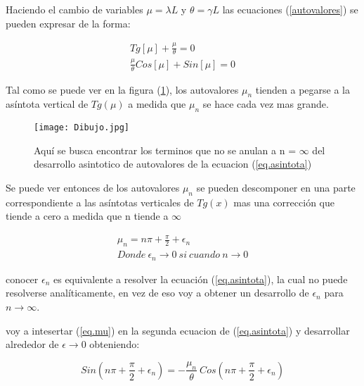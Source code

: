 Haciendo el cambio de variables $\mu = \lambda L$ y $\theta = \gamma L $ las ecuaciones (\ref{autovalores}) se pueden expresar de la forma:

\begin{equation}
\begin{array}{c}
    Tg[\mu] + \frac{\mu}{\theta} = 0 \\
    \frac{\mu}{\theta} Cos[\mu] + Sin[\mu] = 0
\end{array}
\label{eq.asintota}
\end{equation}

Tal como se puede ver en la figura (\ref{fig:Dibujo}), los autovalores $\mu _n$ tienden a pegarse a la asíntota vertical de $ Tg (\mu)$ a medida que $\mu _n$ se hace cada vez mas grande.

\begin{figure}
    \centering
    \texttt{[image: Dibujo.jpg]}
    \caption{Aquí se busca encontrar los terminos que no se anulan a n = $\infty$ del desarrollo asintotico de autovalores de la ecuacion (\ref{eq.asintota}) }
    \label{fig:Dibujo}
\end{figure}

Se puede ver entonces de los autovalores $\mu _n$ se pueden descomponer en una parte correspondiente a las asíntotas verticales de $Tg(x)$ mas una corrección que tiende a cero a medida que n tiende a $\infty$

\begin{equation}
\begin{array}{c}
    \mu _n = n \pi + \frac{\pi}{2} + \epsilon _n \\
    Donde \ \epsilon _n \rightarrow{0} \ si \ cuando \ n \rightarrow{0}
\end{array}
\label{eq.mu}
\end{equation}


conocer $\epsilon _n $ es equivalente a resolver la ecuación (\ref{eq.asintota}), la cual no puede resolverse analíticamente, en vez de eso voy a obtener un desarrollo de $\epsilon _n $ para $n \rightarrow \infty$.

voy a intesertar (\ref{eq.mu}) en la segunda ecuacion de (\ref{eq.asintota}) y desarrollar alrededor de $\epsilon \rightarrow{0}$ obteniendo:

\begin{equation}
    Sin( n \pi + \frac{\pi}{2} + \epsilon _n ) = 
    - \frac{\mu _n}{\theta}  \ Cos( n \pi + \frac{\pi}{2} + \epsilon _n )  
\end{equation}

